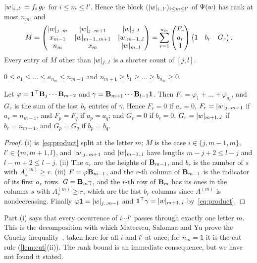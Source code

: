 \documentclass[11pt,a4paper]{article}
\begin{document}
\begin{lemma}\label{lem:pivot}
\begin{parts}
\item $\lvert w\rvert_{i\mathinner{\ldotp\ldotp} l'}=f_i\,g_{l'}$ for $i\le m\le l'$. Hence the block $(\lvert w\rvert_{i\mathinner{\ldotp\ldotp} l'})_{i\le m\le l'}$ of $\Psi(w)$ has rank at most $n_m$, and
\[
M=\begin{pmatrix}\lvert w\rvert_{j\mathinner{\ldotp\ldotp} m}&\lvert w\rvert_{j\mathinner{\ldotp\ldotp} m+1}&\lvert w\rvert_{j\mathinner{\ldotp\ldotp} l}\\ x_{m-1}&\lvert w\rvert_{m-1\mathinner{\ldotp\ldotp} m+1}&\lvert w\rvert_{m-1\mathinner{\ldotp\ldotp} l}\\ n_m&x_m&\lvert w\rvert_{m\mathinner{\ldotp\ldotp} l}\end{pmatrix}=\sum_{r=1}^{n_m}\begin{pmatrix}F_r\\a_r\\1\end{pmatrix}\begin{pmatrix}1&b_r&G_r\end{pmatrix}.
\]
Every entry of $M$ other than $\lvert w\rvert_{j\mathinner{\ldotp\ldotp} l}$ is a shorter count of $[j,l]$.
\item $0\le a_1\le\dots\le a_{n_m}\le n_{m-1}$ and $n_{m+1}\ge b_1\ge\dots\ge b_{n_m}\ge0$.
\item Let $\varphi=\mathbf{1}^{\top}\mathbf{B}_{j}\cdots\mathbf{B}_{m-2}$ and $\gamma=\mathbf{B}_{m+1}\cdots\mathbf{B}_{l-1}\mathbf{1}$. Then $F_r=\varphi_1+\dots+\varphi_{a_r}$, and $G_r$ is the sum of the last $b_r$ entries of $\gamma$. Hence $F_r=0$ if $a_r=0$, $F_r=\lvert w\rvert_{j\mathinner{\ldotp\ldotp} m-1}$ if $a_r=n_{m-1}$, and $F_p=F_q$ if $a_p=a_q$; and $G_r=0$ if $b_r=0$, $G_r=\lvert w\rvert_{m+1\mathinner{\ldotp\ldotp} l}$ if $b_r=n_{m+1}$, and $G_p=G_q$ if $b_p=b_q$.
\end{parts}
\end{lemma}

\begin{proof}
(i) is~\eqref{eq:product} split at the letter $m$; $M$ is the case $i\in\{j,m-1,m\}$, $l'\in\{m,m+1,l\}$, and $\lvert w\rvert_{j\mathinner{\ldotp\ldotp} m+1}$ and $\lvert w\rvert_{m-1\mathinner{\ldotp\ldotp} l}$ have lengths $m-j+2\le l-j$ and $l-m+2\le l-j$. (ii) The $a_r$ are the heights of $\mathbf{B}_{m-1}$, and $b_r$ is the number of $s$ with $A^{(m)}_s\ge r$. (iii) $F=\varphi\mathbf{B}_{m-1}$, and the $r$-th column of $\mathbf{B}_{m-1}$ is the indicator of its first $a_r$ rows. $G=\mathbf{B}_{m}\gamma$, and the $r$-th row of $\mathbf{B}_{m}$ has its ones in the columns $s$ with $A^{(m)}_s\ge r$, which are the last $b_r$ columns since $A^{(m)}$ is nondecreasing. Finally $\varphi\mathbf{1}=\lvert w\rvert_{j\mathinner{\ldotp\ldotp} m-1}$ and $\mathbf{1}^{\top}\gamma=\lvert w\rvert_{m+1\mathinner{\ldotp\ldotp} l}$ by~\eqref{eq:product}.
\end{proof}

Part (i) says that every occurrence of $i\cdots l'$ passes through exactly one letter $m$. This is the decomposition with which Mateescu, Salomaa and Yu prove the Cauchy inequality~\cite[p.~15]{MSY04}, taken here for all $i$ and $l'$ at once; for $n_m=1$ it is the cut rule (\cref{lem:cut}(ii)). The rank bound is an immediate consequence, but we have not found it stated.
\end{document}
